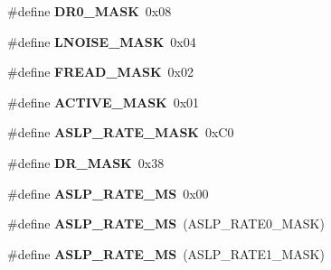 \begin{DoxyCompactItemize}
\item 
\hypertarget{group___engduino_accelerometer_gaa9ed8de0800a936050e4b494b08316b7}{}\#define {\bfseries D\+R0\+\_\+\+M\+A\+S\+K}~0x08\label{group___engduino_accelerometer_gaa9ed8de0800a936050e4b494b08316b7}

\item 
\hypertarget{group___engduino_accelerometer_gae06441d820c5234097475d6f23676f77}{}\#define {\bfseries L\+N\+O\+I\+S\+E\+\_\+\+M\+A\+S\+K}~0x04\label{group___engduino_accelerometer_gae06441d820c5234097475d6f23676f77}

\item 
\hypertarget{group___engduino_accelerometer_ga4130f0c91840f53a50d9a2cba907aa68}{}\#define {\bfseries F\+R\+E\+A\+D\+\_\+\+M\+A\+S\+K}~0x02\label{group___engduino_accelerometer_ga4130f0c91840f53a50d9a2cba907aa68}

\item 
\hypertarget{group___engduino_accelerometer_ga90ead4bf6feaa427557042487e46e680}{}\#define {\bfseries A\+C\+T\+I\+V\+E\+\_\+\+M\+A\+S\+K}~0x01\label{group___engduino_accelerometer_ga90ead4bf6feaa427557042487e46e680}

\item 
\hypertarget{group___engduino_accelerometer_gaf1a376b57345fafe4da1ae35ed59d739}{}\#define {\bfseries A\+S\+L\+P\+\_\+\+R\+A\+T\+E\+\_\+\+M\+A\+S\+K}~0x\+C0\label{group___engduino_accelerometer_gaf1a376b57345fafe4da1ae35ed59d739}

\item 
\hypertarget{group___engduino_accelerometer_gaf304dbcbd80600a1b5a4f0ba808a8e01}{}\#define {\bfseries D\+R\+\_\+\+M\+A\+S\+K}~0x38\label{group___engduino_accelerometer_gaf304dbcbd80600a1b5a4f0ba808a8e01}

\item 
\hypertarget{group___engduino_accelerometer_ga7f4017f7187ad88edb014c4b4f60a355}{}\#define {\bfseries A\+S\+L\+P\+\_\+\+R\+A\+T\+E\+\_\+M\+S}~0x00\label{group___engduino_accelerometer_ga7f4017f7187ad88edb014c4b4f60a355}

\item 
\hypertarget{group___engduino_accelerometer_ga95b386952338e82a484cecb41f825b47}{}\#define {\bfseries A\+S\+L\+P\+\_\+\+R\+A\+T\+E\+\_\+M\+S}~(A\+S\+L\+P\+\_\+\+R\+A\+T\+E0\+\_\+\+M\+A\+S\+K)\label{group___engduino_accelerometer_ga95b386952338e82a484cecb41f825b47}

\item 
\hypertarget{group___engduino_accelerometer_gab7402266af4d7e5c7d4f88508359b706}{}\#define {\bfseries A\+S\+L\+P\+\_\+\+R\+A\+T\+E\+\_\+M\+S}~(A\+S\+L\+P\+\_\+\+R\+A\+T\+E1\+\_\+\+M\+A\+S\+K)\label{group___engduino_accelerometer_gab7402266af4d7e5c7d4f88508359b706}


\end{DoxyCompactItemize}
